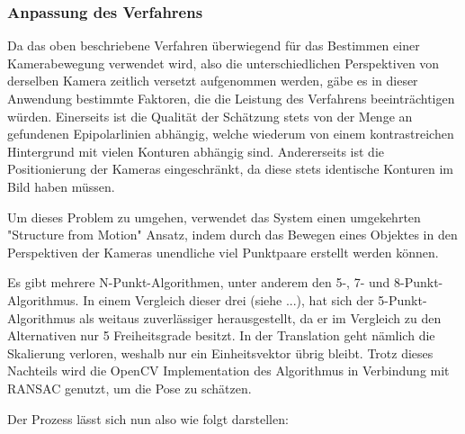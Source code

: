 \documentclass[12pt, ngerman]{article}
\begin{document}
\subsubsection{Anpassung des Verfahrens}
Da das oben beschriebene Verfahren überwiegend für das Bestimmen einer Kamerabewegung verwendet wird, also die unterschiedlichen Perspektiven von derselben Kamera zeitlich versetzt aufgenommen werden, gäbe es in dieser Anwendung bestimmte Faktoren, die die Leistung des Verfahrens beeinträchtigen würden.
Einerseits ist die Qualität der Schätzung stets von der Menge an gefundenen Epipolarlinien abhängig, welche wiederum von einem kontrastreichen Hintergrund mit vielen Konturen abhängig sind. Andererseits ist die Positionierung der Kameras eingeschränkt, da diese stets identische Konturen im Bild haben müssen.

Um dieses Problem zu umgehen, verwendet das System einen umgekehrten "Structure from Motion" Ansatz, indem durch das Bewegen eines Objektes in den Perspektiven der Kameras unendliche viel Punktpaare erstellt werden können. 

Es gibt mehrere N-Punkt-Algorithmen, unter anderem den 5-, 7- und 8-Punkt-Algorithmus. In einem Vergleich dieser drei (siehe ...), hat sich der 5-Punkt-Algorithmus als weitaus zuverlässiger herausgestellt, da er im Vergleich zu den Alternativen nur 5 Freiheitsgrade besitzt. In der Translation geht nämlich die Skalierung verloren, weshalb nur ein Einheitsvektor übrig bleibt. Trotz dieses Nachteils wird die OpenCV Implementation des Algorithmus in Verbindung mit RANSAC genutzt, um die Pose zu schätzen.

\newpage
Der Prozess lässt sich nun also wie folgt darstellen:
\end{document}
